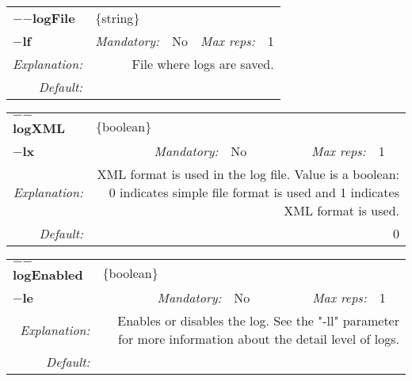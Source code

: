 \begin{center}\begin{tabular}{|rr|rl|rl|}
\hline
\multicolumn{2}{|l|}{\textbf{$-$$-$logFile}} & \multicolumn{4}{|l|}{$\{$string$\}$} \\
\cline{3-6}
\multicolumn{2}{|l|}{\textbf{$-$lf}} & \emph{Mandatory:} & No & \emph{Max reps:} & 1 \\
\hline
\emph{Explanation:} & \multicolumn{5}{|p{12cm}|}{File where logs are saved.} \\
\hline
\emph{Default:} & \multicolumn{5}{|p{12cm}|}{} \\
\hline
\end{tabular}\end{center}
\begin{center}\begin{tabular}{|rr|rl|rl|}
\hline
\multicolumn{2}{|l|}{\textbf{$-$$-$logXML}} & \multicolumn{4}{|l|}{$\{$boolean$\}$} \\
\cline{3-6}
\multicolumn{2}{|l|}{\textbf{$-$lx}} & \emph{Mandatory:} & No & \emph{Max reps:} & 1 \\
\hline
\emph{Explanation:} & \multicolumn{5}{|p{12cm}|}{XML format is used in the log file. Value is a boolean: 0 indicates simple file format is used and 1 indicates XML format is used.} \\
\hline
\emph{Default:} & \multicolumn{5}{|p{12cm}|}{0} \\
\hline
\end{tabular}\end{center}
\begin{center}\begin{tabular}{|rr|rl|rl|}
\hline
\multicolumn{2}{|l|}{\textbf{$-$$-$logEnabled}} & \multicolumn{4}{|l|}{$\{$boolean$\}$} \\
\cline{3-6}
\multicolumn{2}{|l|}{\textbf{$-$le}} & \emph{Mandatory:} & No & \emph{Max reps:} & 1 \\
\hline
\emph{Explanation:} & \multicolumn{5}{|p{12cm}|}{Enables or disables the log. See the "-ll" parameter for more information about the detail level of logs.} \\
\hline
\emph{Default:} & \multicolumn{5}{|p{12cm}|}{} \\
\hline
\end{tabular}\end{center}
